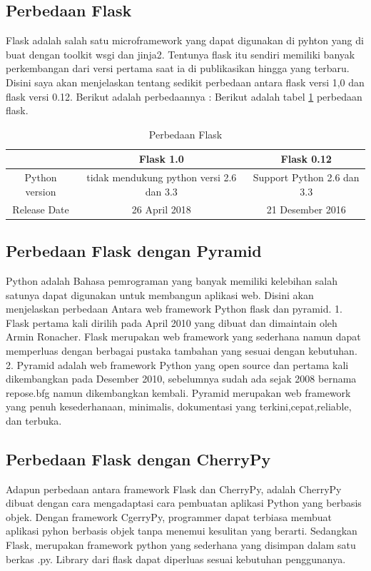 \documentclass[12pt,a4paper]{article}
\begin{document}
\subsection{Perbedaan Flask}
\hspace{1cm} Flask adalah salah satu microframework yang dapat digunakan di pyhton yang di buat dengan toolkit wsgi dan jinja2. Tentunya flask itu sendiri memiliki banyak perkembangan dari versi pertama saat ia di publikasikan hingga yang terbaru. Disini saya akan menjelaskan tentang sedikit perbedaan antara flask versi 1,0 dan flask versi 0.12. Berikut adalah perbedaannya :
Berikut adalah tabel \ref{table:perbedaan} perbedaan flask.
\begin{table}[h]
\caption{Perbedaan Flask}

\centering
\begin{tabular}{ccc}
\hline
&Flask 1.0&Flask 0.12\\
\hline
Python version&tidak mendukung python versi 2.6 dan 3.3&Support Python 2.6 dan 3.3\\
\hline
Release Date&26 April 2018&21 Desember 2016\\
\hline
\end{tabular}
\label{table:perbedaan}
\end{table}

\subsection{Perbedaan Flask dengan Pyramid}
Python adalah Bahasa pemrograman yang banyak memiliki kelebihan salah satunya dapat digunakan untuk membangun aplikasi web. Disini akan menjelaskan perbedaan Antara web framework Python flask dan pyramid.
1.	Flask pertama kali dirilih pada April 2010 yang dibuat dan dimaintain oleh Armin Ronacher. Flask merupakan web framework yang sederhana namun dapat memperluas dengan berbagai pustaka tambahan yang sesuai dengan kebutuhan.
2.	Pyramid adalah web framework Python yang open source dan pertama kali dikembangkan pada Desember 2010, sebelumnya sudah ada sejak 2008 bernama repose.bfg namun dikembangkan kembali. Pyramid merupakan web framework yang penuh kesederhanaan, minimalis, dokumentasi yang terkini,cepat,reliable, dan terbuka.
\subsection{Perbedaan Flask dengan CherryPy}
Adapun perbedaan antara framework Flask dan CherryPy, adalah CherryPy dibuat dengan cara mengadaptasi cara pembuatan aplikasi Python yang berbasis objek. Dengan framework CgerryPy, programmer dapat terbiasa membuat aplikasi pyhon berbasis objek tanpa menemui kesulitan yang berarti. Sedangkan Flask, merupakan framework python yang sederhana yang disimpan dalam satu berkas .py. Library dari flask dapat diperluas sesuai kebutuhan penggunanya.
\end{document}
